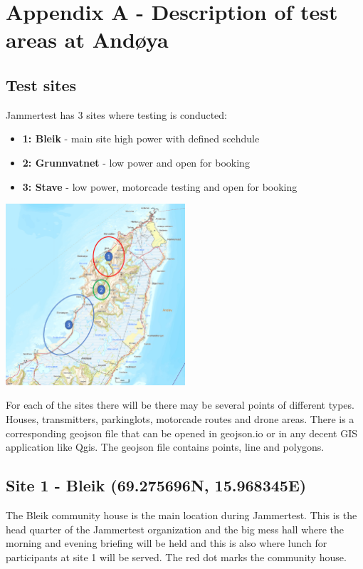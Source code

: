 \graphicspath{ {../graphics/appendixA} }
  
\chapter{Appendix A - Description of test areas at Andøya}

\section{Test sites}

Jammertest has 3 sites where testing is conducted:
\begin{itemize}
    \item \textbf{1:  Bleik} - main site high power with defined scehdule
    \item \textbf{2:  Grunnvatnet} - low power and open for booking
    \item \textbf{3:  Stave} - low power, motorcade testing and open for booking
\end{itemize}

\begin{center}
\includegraphics[width = 0.5\textwidth]{test_sites}
\end{center}

For each of the sites there will be there may be several points of different types. Houses, transmitters, parkinglots, motorcade routes and drone areas. There is a corresponding geojson file that can be opened in geojson.io or in any decent GIS application like Qgis. The geojson file contains points, line and polygons.

\section*{Site 1 - Bleik (69.275696N, 15.968345E)}
The Bleik community house is the main location during Jammertest. This is the head quarter of the Jammertest organization and the big mess hall where the morning and evening briefing will be held and this is also where lunch for participants at site 1 will be served. The red dot marks the community house.\\

